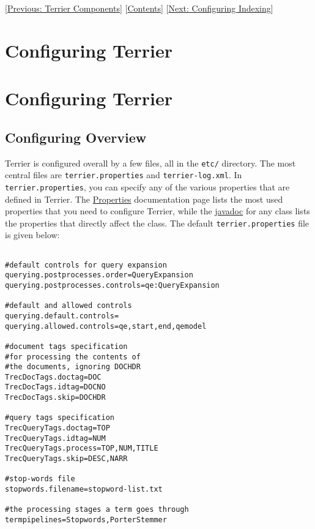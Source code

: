 {[}\href{basicComponents.html}{Previous: Terrier Components}{]}
{[}\href{index.html}{Contents}{]}
{[}\href{configure_indexing.html}{Next: Configuring Indexing}{]}

\section{Configuring Terrier}\label{configuring-terrier}

\section{Configuring Terrier}\label{configuring-terrier-1}

\subsection{Configuring Overview}\label{configuring-overview}

Terrier is configured overall by a few files, all in the \texttt{etc/}
directory. The most central files are \texttt{terrier.properties} and
\texttt{terrier-log.xml}. In \texttt{terrier.properties}, you can
specify any of the various properties that are defined in Terrier. The
\href{properties.html}{Properties} documentation page lists the most
used properties that you need to configure Terrier, while the
\href{javadoc/}{javadoc} for any class lists the properties that
directly affect the class. The default \texttt{terrier.properties} file
is given below:

\begin{verbatim}

#default controls for query expansion
querying.postprocesses.order=QueryExpansion
querying.postprocesses.controls=qe:QueryExpansion

#default and allowed controls
querying.default.controls=
querying.allowed.controls=qe,start,end,qemodel

#document tags specification
#for processing the contents of
#the documents, ignoring DOCHDR
TrecDocTags.doctag=DOC
TrecDocTags.idtag=DOCNO
TrecDocTags.skip=DOCHDR

#query tags specification
TrecQueryTags.doctag=TOP
TrecQueryTags.idtag=NUM
TrecQueryTags.process=TOP,NUM,TITLE
TrecQueryTags.skip=DESC,NARR

#stop-words file
stopwords.filename=stopword-list.txt

#the processing stages a term goes through
termpipelines=Stopwords,PorterStemmer
\end{verbatim}

